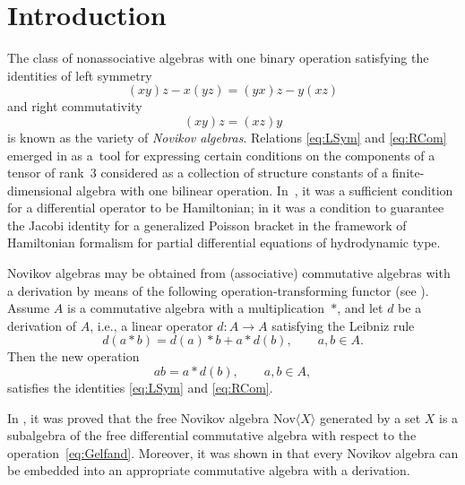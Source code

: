 \documentclass[11pt]{article}
\numberwithin{equation}{section}
\numberwithin{equation}{section}
\def\Nov{\mathrm{Nov}}
\begin{document}
\section{Introduction}%

The class of nonassociative algebras with one binary operation satisfying the identities of left symmetry
%
\begin{equation}\label{eq:LSym}
(xy)z - x(yz) = (yx)z - y(xz)
\end{equation}
%
and right commutativity
%
\begin{equation}\label{eq:RCom}
(xy)z = (xz)y
\end{equation}
%
is known as the variety of {\em Novikov algebras}.
Relations \eqref{eq:LSym} and \eqref{eq:RCom} emerged
in \cite{BN1985, GD79} as a~tool
for expressing certain conditions on the components of
a tensor of rank~3 considered
as a collection of structure constants of a finite-dimensional
 algebra with one bilinear operation.
 In~\cite{GD79}, it was a sufficient condition
for a differential operator to be Hamiltonian;
in \cite{BN1985} it was a condition to guarantee
the Jacobi identity for a generalized Poisson bracket in
the framework of Hamiltonian formalism for partial differential
equations of hydrodynamic type.

Novikov algebras may be obtained from (associative) commutative algebras
with a derivation by means of the following operation-transforming functor (see \cite{GD79}).
Assume $A$ is a commutative algebra
with a multiplication~$*$, and let $d$ be a derivation of $A$, i.e.,
 a linear operator $d\colon A\to A$
satisfying the Leibniz rule
\[
d(a*b) = d(a)*b+a*d(b), \qquad a,b\in A.
\]
Then the new operation
\begin{equation}\label{eq:Gelfand}
ab = a*d(b), \qquad a,b\in A,
\end{equation}
satisfies the identities \eqref{eq:LSym} and \eqref{eq:RCom}.

In \cite{DzhLofwall2002}, it was proved that the free Novikov
algebra $\Nov \langle X\rangle $ generated by a set $X$ is
a subalgebra of the free differential commutative algebra
with respect to the operation~\eqref{eq:Gelfand}.
Moreover, it was shown in \cite{BCZ-2017} that every Novikov algebra
can be embedded into an appropriate
commutative algebra with a derivation.
\end{document}
